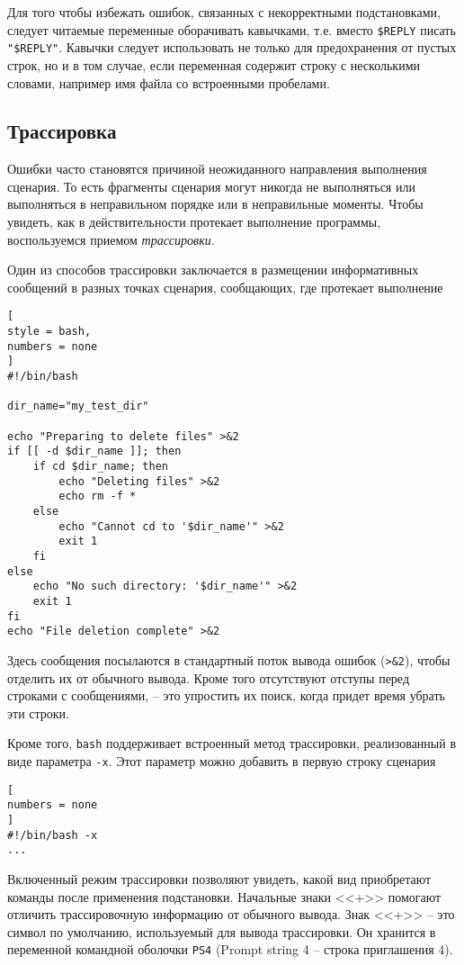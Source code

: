 \documentclass[%
	11pt,
	a4paper,
	utf8,
		]{article}
\begin{document}
Для того чтобы избежать ошибок, связанных с некорректными подстановками, следует читаемые переменные оборачивать кавычками, т.е. вместо \verb|$REPLY| писать \verb|"$REPLY"|. Кавычки следует использовать не только для предохранения от пустых строк, но и в том случае, если переменная содержит строку с несколькими словами, например имя файла со встроенными пробелами.

\subsection{Трассировка}

Ошибки часто становятся причиной неожиданного направления выполнения сценария. То есть фрагменты сценария могут никогда не выполняться или выполняться в неправильном порядке или в неправильные моменты. Чтобы увидеть, как в действительности протекает выполнение программы, воспользуемся приемом \emph{трассировки}.

Один из способов трассировки заключается в размещении информативных сообщений в разных точках сценария, сообщающих, где протекает выполнение
\begin{lstlisting}[
style = bash,
numbers = none
] 
#!/bin/bash

dir_name="my_test_dir"

echo "Preparing to delete files" >&2
if [[ -d $dir_name ]]; then
    if cd $dir_name; then
        echo "Deleting files" >&2
        echo rm -f *
    else
        echo "Cannot cd to '$dir_name'" >&2
        exit 1
    fi
else
    echo "No such directory: '$dir_name'" >&2
    exit 1
fi
echo "File deletion complete" >&2
\end{lstlisting}

Здесь сообщения посылаются в стандартный поток вывода ошибок (\verb|>&2|), чтобы отделить их от обычного вывода. Кроме того отсутствуют отступы перед строками с сообщениями, -- это упростить их поиск, когда придет время убрать эти строки.

Кроме того, \texttt{bash} поддерживает встроенный метод трассировки, реализованный в виде параметра \texttt{-x}. Этот параметр можно добавить в первую строку сценария
\begin{lstlisting}[
numbers = none
]
#!/bin/bash -x
...
\end{lstlisting}

Включенный режим трассировки позволяют увидеть, какой вид приобретают команды после применения подстановки. Начальные знаки <<+>> помогают отличить трассировочную информацию от обычного вывода. Знак <<+>> -- это символ по умолчанию, используемый для вывода трассировки. Он хранится в переменной командной оболочки \texttt{PS4} (Prompt string 4 -- строка приглашения 4).
\end{document}
